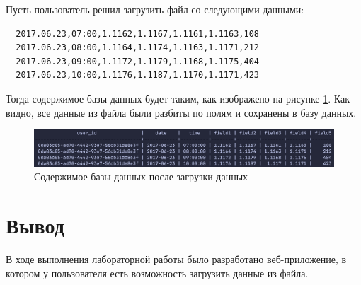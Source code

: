 \documentclass[a4paper, 14pt]{extarticle}
\begin{document}
Пусть пользователь решил загрузить файл со следующими данными:
\begin{verbatim}
  2017.06.23,07:00,1.1162,1.1167,1.1161,1.1163,108
  2017.06.23,08:00,1.1164,1.1174,1.1163,1.1171,212
  2017.06.23,09:00,1.1172,1.1179,1.1168,1.1175,404
  2017.06.23,10:00,1.1176,1.1187,1.1170,1.1171,423
\end{verbatim}
Тогда содержимое базы данных будет таким, как изображено на рисунке
\ref{fig:entries.png}. Как видно, все данные из файла были разбиты по полям и
сохранены в базу данных.

\begin{figure}[H]
  \centering
  \includegraphics[width=\textwidth]{images/entries.png}
  \caption{Содержимое базы данных после загрузки данных}
  \label{fig:entries.png}
\end{figure}

\newpage

\section{Вывод}

В ходе выполнения лабораторной работы было разработано веб-приложение, в котором
у пользователя есть возможность загрузить данные из файла.
\end{document}
